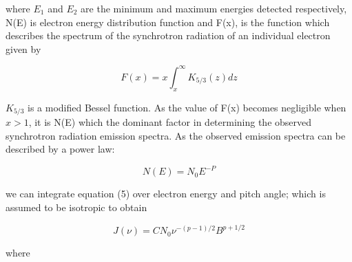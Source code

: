 \documentclass{article}
\begin{document}
where $E_1$ and $E_2$ are the minimum and maximum energies detected respectively, N(E) is electron energy distribution function and F(x), is the function which describes the spectrum of the synchrotron radiation of an individual electron given by

\begin{equation}
    F(x) = x \int_{x}^{\infty} K_{5/3} (z) dz
\end{equation}


$K_{5/3}$ is a modified Bessel function. As the value of F(x) becomes negligible when $x>1$, it is N(E) which the dominant factor in determining the observed synchrotron radiation emission spectra. As the observed emission spectra can be described by a power law:

\begin{equation}
    N(E) = N_0E^{-P}
\end{equation}

we can integrate equation (5) over electron energy and pitch angle; which is assumed to be isotropic to obtain

\begin{equation}
    J(\nu) = CN_0\nu^{-(p-1)/2}B^{p+1/2}
\end{equation}

where
\end{document}
